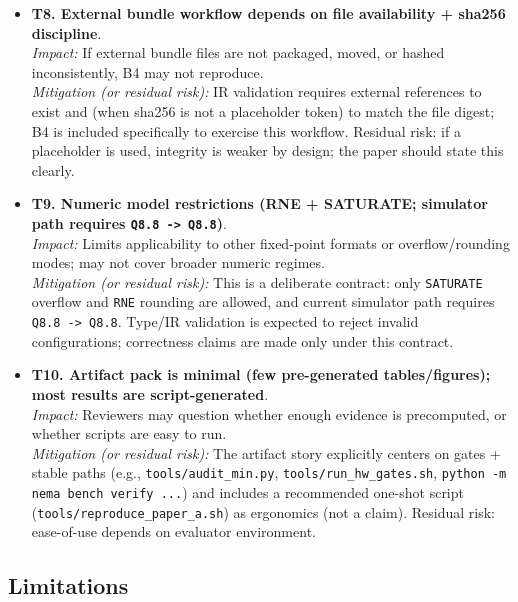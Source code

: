 \begin{itemize}
\item \textbf{T8. External bundle workflow depends on file availability + sha256 discipline}.\\
\textit{Impact:} If external bundle files are not packaged, moved, or hashed inconsistently, B4 may not reproduce.\\
\textit{Mitigation (or residual risk):} IR validation requires external references to exist and (when sha256 is not a placeholder token) to match the file digest; B4 is included specifically to exercise this workflow. Residual risk: if a placeholder is used, integrity is weaker by design; the paper should state this clearly.

\item \textbf{T9. Numeric model restrictions (RNE + SATURATE; simulator path requires \texttt{Q8.8 -> Q8.8})}.\\
\textit{Impact:} Limits applicability to other fixed-point formats or overflow/rounding modes; may not cover broader numeric regimes.\\
\textit{Mitigation (or residual risk):} This is a deliberate contract: only \texttt{SATURATE} overflow and \texttt{RNE} rounding are allowed, and current simulator path requires \texttt{Q8.8 -> Q8.8}. Type/IR validation is expected to reject invalid configurations; correctness claims are made only under this contract.

\item \textbf{T10. Artifact pack is minimal (few pre-generated tables/figures); most results are script-generated}.\\
\textit{Impact:} Reviewers may question whether enough evidence is precomputed, or whether scripts are easy to run.\\
\textit{Mitigation (or residual risk):} The artifact story explicitly centers on gates + stable paths (e.g., \texttt{tools/audit\_min.py}, \texttt{tools/run\_hw\_gates.sh}, \texttt{python -m nema bench verify ...}) and includes a recommended one-shot script (\texttt{tools/reproduce\_paper\_a.sh}) as ergonomics (not a claim). Residual risk: ease-of-use depends on evaluator environment.
\end{itemize}

\subsection{Limitations}

